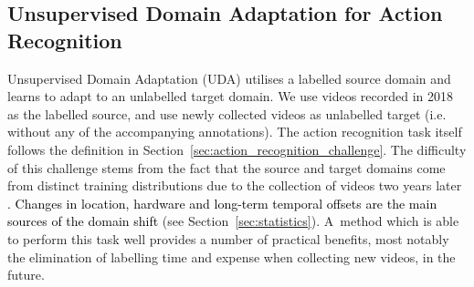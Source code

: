 \documentclass[twocolumn]{svjour3}          \smartqed
\newcommand{\chParagraph}[1]{\noindent {\textbf{#1.}} \hspace{6pt}}
\newcommand{\edits}[1]{\textcolor{black}{#1}}
\begin{document}
\subsection{Unsupervised Domain Adaptation for Action Recognition}
\label{sec:domain_adaptation_challenge}
\chParagraph{Definition}
Unsupervised Domain Adaptation (UDA) utilises a labelled source domain and learns to adapt to an unlabelled target domain.
We use videos recorded in 2018 as the labelled source, and use newly collected videos as unlabelled target (i.e. without any of the accompanying annotations).
The action recognition task itself follows the definition in Section~\ref{sec:action_recognition_challenge}.
The difficulty of this challenge stems from the fact that the source and target domains come from distinct training distributions due to the collection of videos two years later \edits{. Changes in location, hardware and long-term temporal offsets are the main sources of the domain shift} (see Section~\ref{sec:statistics}).  
A~method which is able to perform this task well provides a number of practical benefits, most notably the elimination of labelling time and expense when collecting new videos, in the future.
\end{document}
